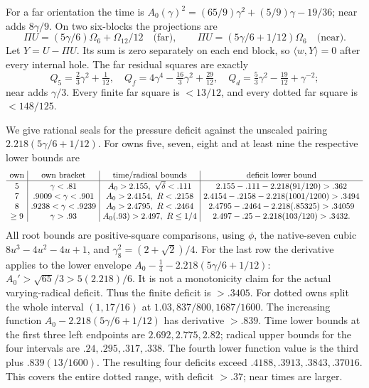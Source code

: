 \documentclass[11pt]{article}
\theoremstyle{definition}
\theoremstyle{remark}
\newcommand{\ip}[2]{\langle #1,#2\rangle}
\begin{document}
For a far orientation the time is
\(A_0(\gamma)^2=(65/9)\gamma^2+(5/9)\gamma-19/36\);
near adds \(8\gamma/9\).
On two six-blocks the projections are
\[
 \Pi U=(5\gamma/6)\Omega_6+\Omega_{12}/12\quad\text{(far)},\qquad
 \Pi U=(5\gamma/6+1/12)\Omega_6\quad\text{(near)} .
\]
Let \(Y=U-\Pi U\). Its sum is zero separately on each end block,
so \(\ip wY=0\) after every internal hole.
The far residual squares are exactly
\[
 Q_5=\tfrac23\gamma^2+\tfrac1{12},\quad
 Q_f=4\gamma^4-\tfrac{16}3\gamma^2+\tfrac{29}{12},\quad
 Q_d=\tfrac53\gamma^2-\tfrac{19}{12}+\gamma^{-2};
\]
near adds \(\gamma/3\).
Every finite far square is \(<13/12\), and every dotted far square
is \(<148/125\).

We give rational seals for the pressure deficit against the unscaled
pairing \(2.218(5\gamma/6+1/12)\).
For owns five, seven, eight and at least nine the respective lower bounds
are
\[
{\setlength{\arraycolsep}{4pt}
\begin{array}{c|c|c|c}
\text{own}&\text{own bracket}&\text{time/radical bounds}&
 \text{deficit lower bound}\\ \hline
5&\gamma<.81&A_0>2.155,\ \sqrt\delta<.111&
 2.155-.111-2.218(91/120)>.362\\
7&.9009<\gamma<.901&A_0>2.4154,\ R<.2158&
 2.4154-.2158-2.218(1001/1200)>.3494\\
8&.9238<\gamma<.9239&A_0>2.4795,\ R<.2464&
 2.4795-.2464-2.218(.85325)>.34059\\
\geq9&\gamma>.93&A_0(.93)>2.497,\ R\leq1/4&
 2.497-.25-2.218(103/120)>.3432 .
\end{array}}
\]
All root bounds are positive-square comparisons, using
\(\phi\), the native-seven cubic \(8u^3-4u^2-4u+1\), and
\(\gamma_8^2=(2+\sqrt2)/4\).
For the last row the derivative applies to the lower envelope
\(A_0-\tfrac14-2.218(5\gamma/6+1/12)\):
\(A_0'>\sqrt{65}/3>5(2.218)/6\).
It is not a monotonicity claim for the actual varying-radical deficit.
Thus the finite deficit is \(>.3405\).
For dotted owns split the whole interval \((1,17/16)\) at
\(1.03,837/800,1687/1600\).
The increasing function \(A_0-2.218(5\gamma/6+1/12)\) has
derivative \(>.839\).
Time lower bounds at the first three left endpoints are
\(2.692,2.775,2.82\); radical upper bounds for the four intervals
are \(.24,.295,.317,.338\).
The fourth lower function value is the third plus
\(.839(13/1600)\).
The resulting four deficits exceed
\(.4188,.3913,.3843,.37016\).
This covers the entire dotted range, with deficit \(>.37\);
near times are larger.
\end{document}

